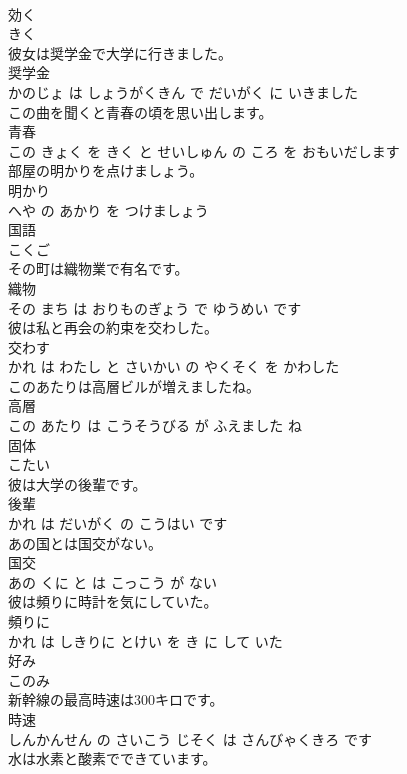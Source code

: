 \documentclass[8pt]{extreport}
\begin{document}
\begin{CJK}{UTF8}{min}
\\	効く	
\\	きく			
\\	彼女は奨学金で大学に行きました。	
\\	奨学金 
\\	かのじょ は しょうがくきん で だいがく に いきました			
\\	この曲を聞くと青春の頃を思い出します。	
\\	青春 
\\	この きょく を きく と せいしゅん の ころ を おもいだします			
\\	部屋の明かりを点けましょう。	
\\	明かり 
\\	へや の あかり を つけましょう			
\\	国語	
\\	こくご			
\\	その町は織物業で有名です。	
\\	織物 
\\	その まち は おりものぎょう で ゆうめい です			
\\	彼は私と再会の約束を交わした。	
\\	交わす 
\\	かれ は わたし と さいかい の やくそく を かわした			
\\	このあたりは高層ビルが増えましたね。	
\\	高層 
\\	この あたり は こうそうびる が ふえました ね			
\\	固体	
\\	こたい			
\\	彼は大学の後輩です。	
\\	後輩 
\\	かれ は だいがく の こうはい です			
\\	あの国とは国交がない。	
\\	国交 
\\	あの くに と は こっこう が ない			
\\	彼は頻りに時計を気にしていた。	
\\	頻りに 
\\	かれ は しきりに とけい を き に して いた			
\\	好み	
\\	このみ			
\\	新幹線の最高時速は300キロです。	
\\	時速 
\\	しんかんせん の さいこう じそく は さんびゃくきろ です			
\\	水は水素と酸素でできています。	

\end{CJK}
\end{document}

